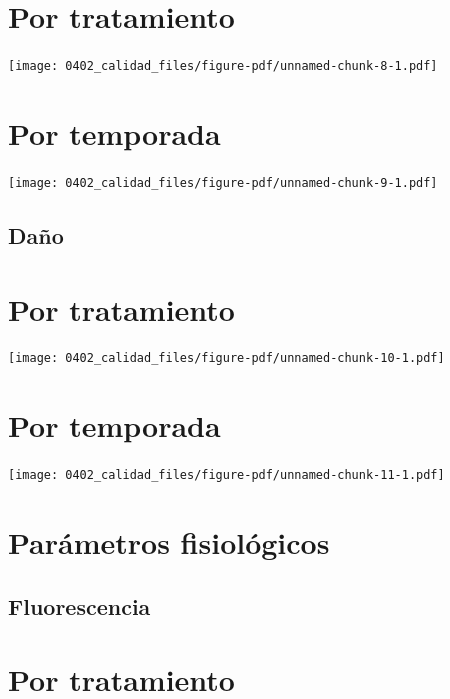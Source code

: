 \documentclass[
  letterpaper,
  DIV=11,
  numbers=noendperiod]{scrreprt}
\begin{document}
\chapter{Por tratamiento}

\begin{center}
\texttt{[image: 0402\_calidad\_files/figure-pdf/unnamed-chunk-8-1.pdf]}
\end{center}

\chapter{Por temporada}

\begin{center}
\texttt{[image: 0402\_calidad\_files/figure-pdf/unnamed-chunk-9-1.pdf]}
\end{center}

\section{Daño}\label{dauxf1o-1}

\chapter{Por tratamiento}

\begin{center}
\texttt{[image: 0402\_calidad\_files/figure-pdf/unnamed-chunk-10-1.pdf]}
\end{center}

\chapter{Por temporada}

\begin{center}
\texttt{[image: 0402\_calidad\_files/figure-pdf/unnamed-chunk-11-1.pdf]}
\end{center}

\chapter{Parámetros fisiológicos}\label{paruxe1metros-fisioluxf3gicos-1}

\section{Fluorescencia}\label{fluorescencia-1}

\chapter{Por tratamiento}
\end{document}
